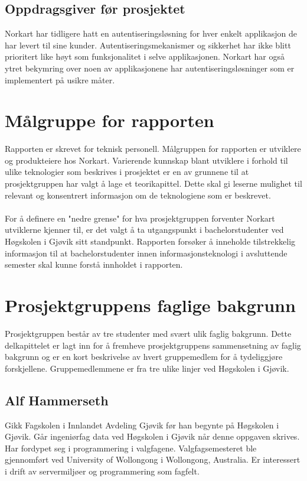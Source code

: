 \subsection{Oppdragsgiver før prosjektet}
\label{subsec:innledning_oppdragsgiverForProsjekt}
Norkart har tidligere hatt en autentiseringsløsning for hver enkelt applikasjon de har levert til sine kunder. Autentiseringsmekanismer og sikkerhet har ikke blitt prioritert like høyt som funksjonalitet i selve applikasjonen. Norkart har også ytret bekymring over noen av applikasjonene har autentiseringsløsninger som er implementert på usikre måter.


\section{Målgruppe for rapporten}
\label{sec:innledning_malgruppeForRapporten}
Rapporten er skrevet for teknisk personell. Målgruppen for rapporten er utviklere og produkteiere hos Norkart. Varierende kunnskap blant utviklere i forhold til ulike teknologier som beskrives i prosjektet er en av grunnene til at prosjektgruppen har valgt å lage et teorikapittel. Dette skal gi leserne mulighet til relevant og konsentrert informasjon om de teknologiene som er beskrevet. 
\\
\\
For å definere en "nedre grense" for hva prosjektgruppen forventer Norkart utviklerne kjenner til, er det valgt å ta utgangspunkt i bachelorstudenter ved Høgskolen i Gjøvik sitt standpunkt. Rapporten forsøker å inneholde tilstrekkelig informasjon til at bachelorstudenter innen informasjonsteknologi i avsluttende semester skal kunne forstå innholdet i rapporten. 

\section{Prosjektgruppens faglige bakgrunn}
\label{sec:innledning_prosjektgruppensFagligeBakgrunn}
Prosjektgruppen består av tre studenter med svært ulik faglig bakgrunn. Dette delkapittelet er lagt inn for å fremheve prosjektgruppens sammensetning av faglig bakgrunn og er en kort beskrivelse av hvert gruppemedlem for å tydeliggjøre forskjellene. Gruppemedlemmene er fra tre ulike linjer ved Høgskolen i Gjøvik.

\subsection*{Alf Hammerseth}
Gikk Fagskolen i Innlandet Avdeling Gjøvik før han begynte på Høgskolen i Gjøvik. Går ingeniørfag data ved Høgskolen i Gjøvik når denne oppgaven skrives. Har fordypet seg i programmering i valgfagene. Valgfagsemesteret ble gjennomført ved University of Wollongong i Wollongong, Australia. Er interessert i drift av servermiljøer og programmering som fagfelt.


